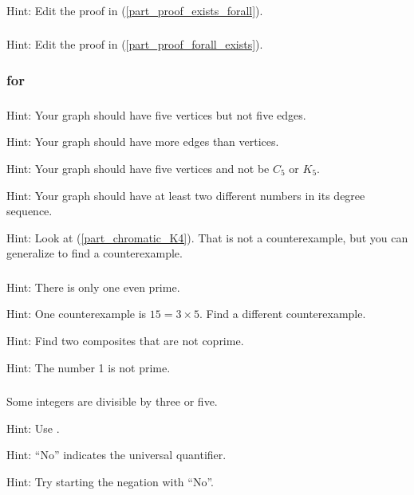 \subsubsection*{ \answers}
Hint: Edit the proof in  (\ref{part_proof_exists_forall}).

\subsubsection*{  \answers}
Hint: Edit the proof in  (\ref{part_proof_forall_exists}).

\subsubsection{\answers for  \subcex}

\subsubsection*{ \answers}
\begin{apart}
    \item Hint: Your graph should have five vertices but not five edges.
    \item Hint: Your graph should have more edges than vertices.
    \item Hint: Your graph should have five vertices and not be $C_5$ or $K_5$. 
    \item Hint: Your graph should have at least two different numbers in its degree sequence.
    \item Hint: Look at  (\ref{part_chromatic_K4}).  That is not a counterexample, but you can generalize to find a counterexample.
\end{apart}

\subsubsection*{ \answers}
\begin{apart}
    \item Hint: There is only one even prime.
    \item Hint: One counterexample is $15=3 \times 5$.  Find a different counterexample.
    \item Hint: Find two composites that are not coprime.  
    \item Hint: The number 1 is not prime.
\end{apart}

\subsubsection*{ \answers}
\begin{apart}
    \item Some integers are divisible by three or five.
    \item Hint: Use .
    \item Hint: ``No'' indicates the universal quantifier.
    \item Hint: Try starting the negation with ``No''.
\end{apart}




